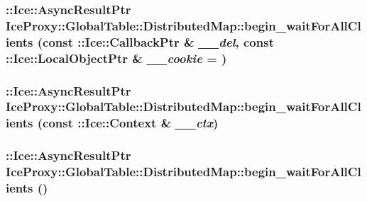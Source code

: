 \label{class_ice_proxy_1_1_global_table_1_1_distributed_map_abf099130b62fb48def9a78f2a05b290f}
\hypertarget{class_ice_proxy_1_1_global_table_1_1_distributed_map_a8ca463f898a8445e466a54402518ffc6}{
\subsubsection[{begin\_\-waitForAllClients}]{\setlength{\rightskip}{0pt plus 5cm}::Ice::AsyncResultPtr IceProxy::GlobalTable::DistributedMap::begin\_\-waitForAllClients (const ::Ice::CallbackPtr \& {\em \_\-\_\-del}, \/  const ::Ice::LocalObjectPtr \& {\em \_\-\_\-cookie} = {})}}
\label{class_ice_proxy_1_1_global_table_1_1_distributed_map_a8ca463f898a8445e466a54402518ffc6}
\hypertarget{class_ice_proxy_1_1_global_table_1_1_distributed_map_a3c736216e45dc8006fde4b73131f2148}{
\subsubsection[{begin\_\-waitForAllClients}]{\setlength{\rightskip}{0pt plus 5cm}::Ice::AsyncResultPtr IceProxy::GlobalTable::DistributedMap::begin\_\-waitForAllClients (const ::Ice::Context \& {\em \_\-\_\-ctx})}}
\label{class_ice_proxy_1_1_global_table_1_1_distributed_map_a3c736216e45dc8006fde4b73131f2148}
\hypertarget{class_ice_proxy_1_1_global_table_1_1_distributed_map_a874afc4d8f61d5e42bfdecfb69555e9b}{
\subsubsection[{begin\_\-waitForAllClients}]{\setlength{\rightskip}{0pt plus 5cm}::Ice::AsyncResultPtr IceProxy::GlobalTable::DistributedMap::begin\_\-waitForAllClients ()}}

